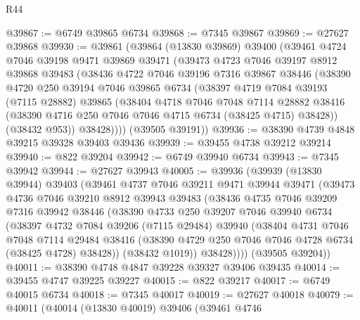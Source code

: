 \begin{lexlean}{R44}
\begin{coremodule}
{@39867 := @6749 @39865 @6734
@39868 := @7345 @39867
@39869 := @27627 @39868
@39930 := @39861
    (@39864
      (@13830 @39869)
      @39400
      (@39461
        @4724
        @7046
        @39198
        @9471
        @39869
        @39471
        (@39473
          @4723
          @7046
          @39197
          @8912
          @39868
          @39483
          (@38436
            @4722
            @7046
            @39196
            @7316
            @39867
            @38446
            (@38390
              @4720
              @250
              @39194
              @7046
              @39865
              @6734
              (@38397
                @4719
                @7084
                @39193
                (@7115 @28882)
                @39865
                (@38404
                  @4718
                  @7046
                  @7048
                  @7114
                  @28882
                  @38416
                  (@38390 @4716 @250 @7046 @7046 @4715 @6734 (@38425 @4715) @38428))
                (@38432 @953))
              @38428))))
      (@39505 @39191))
@39936 := @38390 @4739 @4848 @39215 @39328 @39403 @39436
@39939 := @39455 @4738 @39212 @39214
@39940 := @822 @39204
@39942 := @6749 @39940 @6734
@39943 := @7345 @39942
@39944 := @27627 @39943
@40005 := @39936
    (@39939
      (@13830 @39944)
      @39403
      (@39461
        @4737
        @7046
        @39211
        @9471
        @39944
        @39471
        (@39473
          @4736
          @7046
          @39210
          @8912
          @39943
          @39483
          (@38436
            @4735
            @7046
            @39209
            @7316
            @39942
            @38446
            (@38390
              @4733
              @250
              @39207
              @7046
              @39940
              @6734
              (@38397
                @4732
                @7084
                @39206
                (@7115 @29484)
                @39940
                (@38404
                  @4731
                  @7046
                  @7048
                  @7114
                  @29484
                  @38416
                  (@38390 @4729 @250 @7046 @7046 @4728 @6734 (@38425 @4728) @38428))
                (@38432 @1019))
              @38428))))
      (@39505 @39204))
@40011 := @38390 @4748 @4847 @39228 @39327 @39406 @39435
@40014 := @39455 @4747 @39225 @39227
@40015 := @822 @39217
@40017 := @6749 @40015 @6734
@40018 := @7345 @40017
@40019 := @27627 @40018
@40079 := @40011
    (@40014
      (@13830 @40019)
      @39406
      (@39461
        @4746
}
\end{coremodule}
\end{lexlean}
